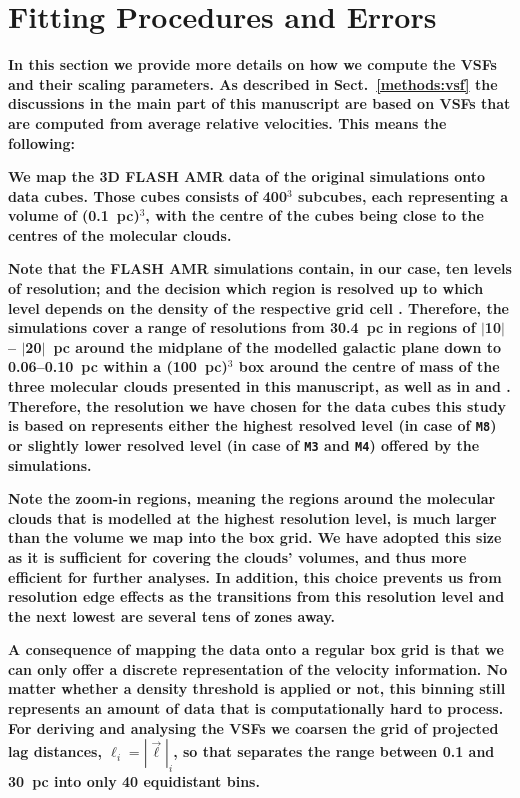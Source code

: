 \section{Fitting Procedures and Errors}\label{appFitting}

\textbf{
    In this section we provide more details on how we compute the VSFs and their scaling parameters.
    As described in Sect.~\ref{methods:vsf} the discussions in the main part of this manuscript are based on VSFs that are computed from average relative velocities. 
    This means the following:
}

\textbf{ 
    We map the 3D FLASH AMR data of the original simulations  onto data cubes. 
    Those cubes consists of 400$^3$ subcubes, each representing a volume of (0.1~pc)$^3$, with the centre of the cubes being close to the centres of the molecular clouds. 
}

\textbf{
    Note that the FLASH AMR simulations contain, in our case, ten levels of resolution; and the decision which region is resolved up to which level depends on the density of the respective grid cell .
    Therefore, the simulations cover a range of resolutions from 30.4~pc in regions of $|$10$|$-- $|$20$|$~pc around the midplane of the modelled galactic plane down to 0.06--0.10~pc within a (100~pc)$^3$ box around the centre of mass of the three molecular clouds presented in this manuscript, as well as in  and . 
    Therefore, the resolution we have chosen for the data cubes this study is based on represents either the highest resolved level (in case of \texttt{M8}) or slightly lower resolved level (in case of \texttt{M3} and \texttt{M4}) offered by the simulations.
}

\textbf{
    Note the zoom-in regions, meaning the regions around the molecular clouds that is modelled at the highest resolution level, is much larger than the volume we map into the box grid. 
    We have adopted this size as it is sufficient for covering the clouds' volumes, and thus more efficient for further analyses. 
    In addition, this choice prevents us from resolution edge effects as the transitions from this resolution level and the next lowest are several tens of zones away. 
}

\textbf{
    A consequence of mapping the data onto a regular box grid is that we can only offer a discrete representation of the velocity information. 
    No matter whether a density threshold is applied or not, this binning still represents an amount of data that is computationally hard to process.
    For deriving and analysing the VSFs we coarsen the grid of projected lag distances, $\ell_i = |\vec{\ell}|_i$, so that separates the range between 0.1 and 30~pc into only 40 equidistant bins.
}

